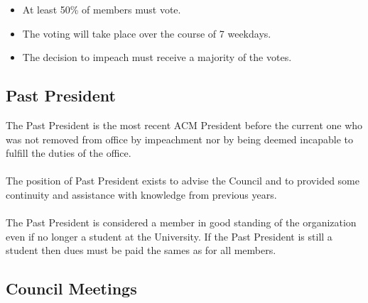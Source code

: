 \documentclass[12pt,titlepage]{article}
\begin{document}
\begin{itemize}
	\item At least 50\% of members must vote.
	\item The voting will take place over the course of 7 weekdays.
	\item The decision to impeach must receive a majority of the votes.
\end{itemize}

\subsection{Past President}

The Past President is the most recent ACM President before the current one who was not removed from office by impeachment nor by being deemed incapable to fulfill the duties of the office.\\
\\
The position of Past President exists to advise the Council and to provided some continuity and assistance with knowledge from previous years.\\
\\
The Past President is considered a member in good standing of the organization even if no longer a student at the University. If the Past President is still a student then dues must be paid the sames as for all members.

\subsection{Council Meetings}
\end{document}
